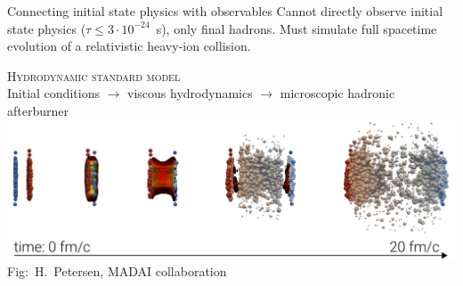 \documentclass{beamer}
\begin{document}
\begin{frame}{Connecting initial state physics with observables}
  \bigskip
  Cannot directly observe initial state physics ($\tau \le 3 \cdot 10^{-24}$~s), only final hadrons. Must simulate full spacetime evolution of a relativistic heavy-ion collision. \\[3ex]

  \begin{center}
    \textcolor{theme}{\scshape Hydrodynamic standard model}\\
    {\scriptsize Initial conditions $\rightarrow$ viscous hydrodynamics $\rightarrow$ microscopic hadronic afterburner}\\[1ex]
    \includegraphics[width=\textwidth]{hic_picture1}\\
    {\tiny Fig:\ H.\ Petersen, MADAI collaboration}
  \end{center}

\end{frame}
\end{document}
